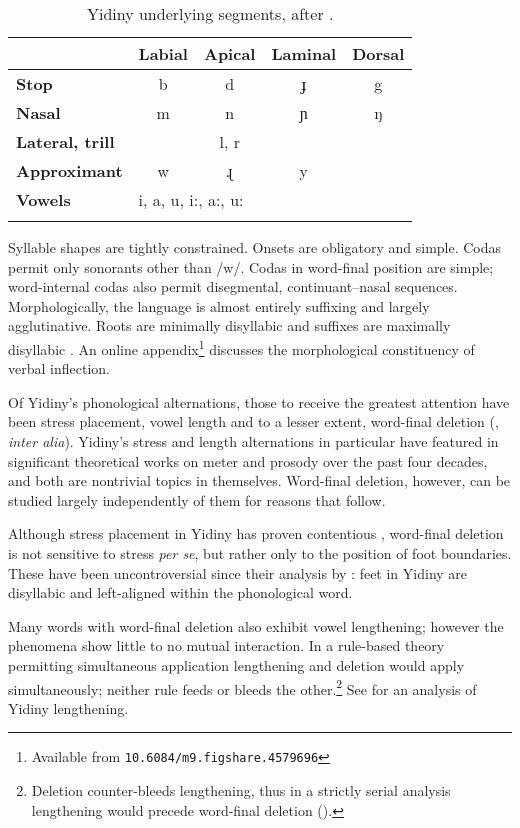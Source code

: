 \documentclass[output=paper,
modfonts
]{LSP/langsci}
\begin{document}
\begin{table}
\caption{Yidiny underlying segments, after \citet[32]{dixon1977a}.}
\label{tab:1}
\begin{tabular}{lcccc}
\lsptoprule
 & \textbf{Labial} & \textbf{Apical} & \textbf{Laminal} & \textbf{Dorsal}\\
\midrule
\textbf{Stop} & b & d & ɟ & g\\
\textbf{Nasal} & m & n & ɲ & ŋ\\
\textbf{Lateral, trill} & & l, r & & \\
\textbf{Approximant} & w & ɻ & y & \\
\midrule
\textbf{Vowels} & \multicolumn{2}{l}{i, a, u, i:, a:, u:} & & \\
\lspbottomrule
\end{tabular}
\end{table}

Syllable shapes are tightly constrained. Onsets are obligatory and simple. Codas permit only sonorants other than /w/. Codas in word-final position are simple; word-internal codas also permit disegmental, continuant--nasal sequences. Morphologically, the language is almost entirely suffixing and largely agglutinative. Roots are minimally disyllabic and suffixes are maximally disyllabic \citep[35,90]{dixon1977a}. An online appendix\footnote{Available from \texttt{10.6084/m9.figshare.4579696}} discusses the morphological constituency of verbal inflection.

Of Yidiny's phonological alternations, those to receive the greatest attention have been stress placement, vowel length and to a lesser extent, word-final deletion (\citealt{dixon1977a,dixon1977b,hayes1982r,hayes1985,kager1993,crowhurst1995,halle1995,hall2001,pruitt2010,hyde2012,bowern}, \textit{inter alia}). Yidiny's stress and length alternations in particular have featured in significant theoretical works on meter and prosody over the past four decades, and both are nontrivial topics in themselves. Word-final deletion, however, can be studied largely independently of them for reasons that follow. 

Although stress placement in Yidiny has proven contentious \citep{pruitt2010,bowern}, word-final deletion is not sensitive to stress \textit{per se}, but rather only to the position of foot boundaries. These have been uncontroversial since their analysis by \citet{hayes1982r}: feet in Yidiny are disyllabic and left-aligned within the phonological word. 

Many words with word-final deletion also exhibit vowel lengthening; however the phenomena show little to no mutual interaction. In a rule-based theory permitting simultaneous application \citep{anderson1974} lengthening and deletion would apply simultaneously; neither rule feeds or bleeds the other.\footnote{Deletion counter-bleeds lengthening, thus in a strictly serial analysis lengthening would precede word-final deletion (\citealt{dixon1977a,dixon1977b,hayes1985,crowhurst1995}).} See \citet{round} for an analysis of Yidiny lengthening.
\end{document}
